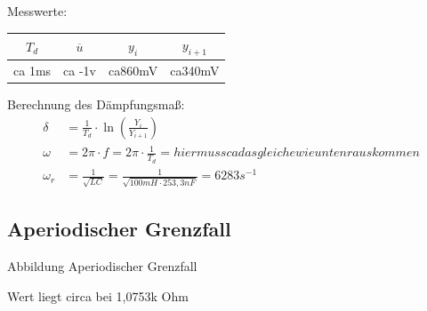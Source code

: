 \documentclass{article}
\begin{document}
Messwerte:
\begin{table}[h]
  \begin{center}

    \begin{tabular}{|c|c|c|c|}
      \hline
        $T_d$ &$\overline{u}$ & $y_i$  & $y_{i+1}$\\
      \hline
             ca 1ms&    ca -1v&   ca860mV  &    ca340mV    \\         
      \hline
    \end{tabular}
  \end{center}
\end{table}
Berechnung des Dämpfungsmaß:
\begin{align*}
  \delta &= \frac{1}{T_d} \cdot \ln \left(\frac{Y_i}{Y_{i+1}}\right)\\
  \omega &= 2\pi \cdot f = 2\pi \cdot \frac{1}{T_d} = hier muss ca das gleiche wie unten rauskommen \\
  \omega_r &= \frac{1}{\sqrt{LC}} = \frac{1}{\sqrt{100mH \cdot 253,3nF}} = 6283 s^{-1}
\end{align*}


\subsection{Aperiodischer Grenzfall}

Abbildung Aperiodischer Grenzfall

Wert liegt circa bei 1,0753k Ohm
\end{document}
